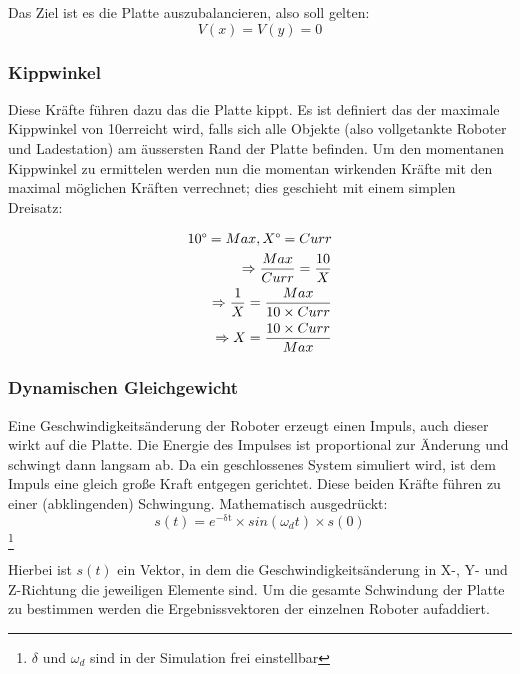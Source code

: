Das Ziel ist es die Platte auszubalancieren, also soll gelten:
\begin{equation}\label{eq:gleichgewicht}
	V(x) = V(y) = 0
\end{equation}

\subsubsection{Kippwinkel}
Diese Kr{\"{a}}fte f{\"{u}}hren dazu das die Platte kippt. Es ist definiert das der maximale Kippwinkel von 10\textdegree erreicht wird, falls sich alle
Objekte (also vollgetankte Roboter und Ladestation) am {\"{a}}ussersten Rand der Platte befinden. Um den momentanen Kippwinkel zu ermittelen werden nun
die momentan wirkenden Kr{\"{a}}fte mit den maximal m{\"{o}}glichen Kr{\"{a}}ften verrechnet; dies geschieht mit einem simplen Dreisatz:

\begin{align}\label{eq:tilt-from-maxtilt}
10\degree = Max, X\degree = Curr \\
\Rightarrow \frac{Max}{Curr} = \frac{10}{X} \\
\Rightarrow \frac{1}{X} = \frac{Max}{10 \times Curr} \\
\Rightarrow X = \frac{10 \times Curr}{Max}
\end{align}

\subsubsection{Dynamischen Gleichgewicht}
Eine Geschwindigkeits{\"{a}}nderung der Roboter erzeugt einen Impuls, auch dieser wirkt auf die Platte. Die Energie des Impulses ist proportional zur
{\"{A}}nderung und schwingt dann langsam ab. Da ein geschlossenes System simuliert wird, ist dem Impuls eine gleich gro{\ss}e Kraft entgegen gerichtet.
Diese beiden Kr{\"{a}}fte f{\"{u}}hren zu einer (abklingenden) Schwingung. Mathematisch ausgedr{\"{u}}ckt:
\begin{equation}\label{eq:schwingung}
	s(t) = e^\mathrm{-\delta t} \times sin(\omega_d t) \times s(0)
\end{equation}
\cite{wiki:schwingung}
\footnote{$\delta$ und $\omega_d$ sind in der Simulation frei einstellbar}

Hierbei ist $s(t)$ ein Vektor, in dem die Geschwindigkeits{\"{a}}nderung in X-, Y- und Z-Richtung die jeweiligen Elemente sind. Um die gesamte Schwindung der
Platte zu bestimmen werden die Ergebnissvektoren der einzelnen Roboter aufaddiert.

